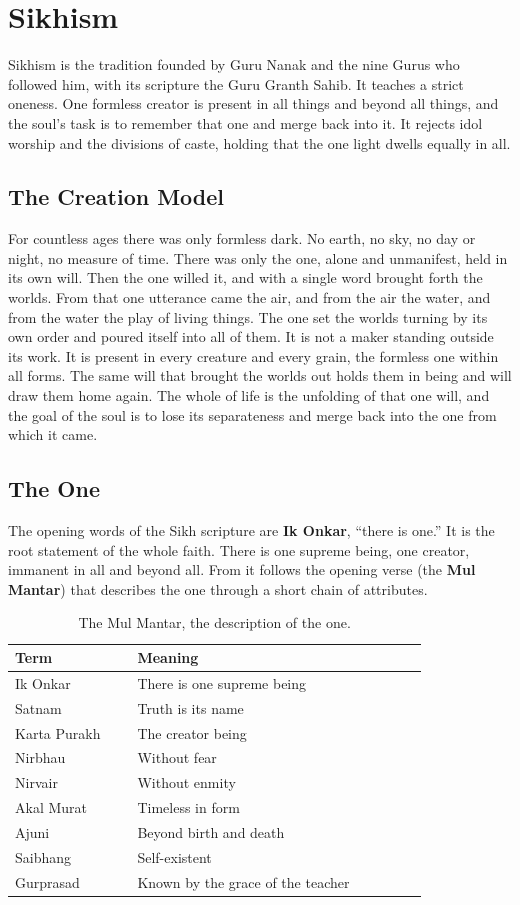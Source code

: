\section{Sikhism}

Sikhism is the tradition founded by Guru Nanak and the nine Gurus who followed
him, with its scripture the Guru Granth Sahib. It teaches a strict oneness. One
formless creator is present in all things and beyond all things, and the soul's
task is to remember that one and merge back into it. It rejects idol worship and
the divisions of caste, holding that the one light dwells equally in all.

\subsection{The Creation Model}

For countless ages there was only formless dark. No earth, no sky, no day or
night, no measure of time. There was only the one, alone and unmanifest, held
in its own will. Then the one willed it, and with a single word brought forth
the worlds. From that one utterance came the air, and from the air the water,
and from the water the play of living things. The one set the worlds turning by
its own order and poured itself into all of them. It is not a maker standing
outside its work. It is present in every creature and every grain, the formless
one within all forms. The same will that brought the worlds out holds them in
being and will draw them home again. The whole of life is the unfolding of that
one will, and the goal of the soul is to lose its separateness and merge back
into the one from which it came.

\subsection{The One}

The opening words of the Sikh scripture are \textbf{Ik Onkar}, \enquote{there is
one.} It is the root statement of the whole faith. There is one supreme being,
one creator, immanent in all and beyond all. From it follows the
opening verse (the \textbf{Mul Mantar}) that describes the one through a short
chain of attributes.

\begin{longtable}{L{0.24\linewidth} L{0.58\linewidth}}
\caption{The Mul Mantar, the description of the one.}\\
\toprule
Term & Meaning \\
\midrule
Ik Onkar & There is one supreme being \\
Satnam & Truth is its name \\
Karta Purakh & The creator being \\
Nirbhau & Without fear \\
Nirvair & Without enmity \\
Akal Murat & Timeless in form \\
Ajuni & Beyond birth and death \\
Saibhang & Self-existent \\
Gurprasad & Known by the grace of the teacher \\
\bottomrule
\end{longtable}

